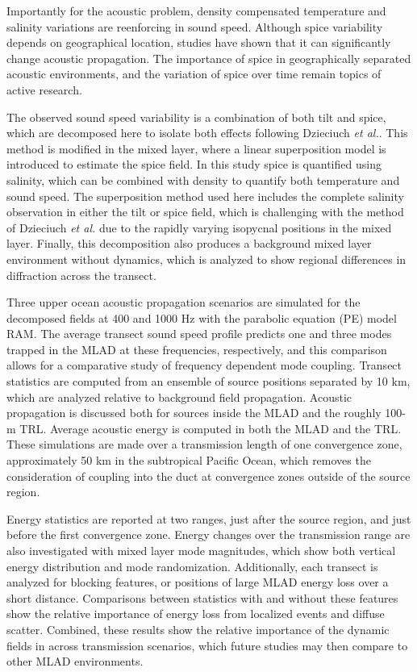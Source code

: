 \documentclass[preprint,NumberedRefs]{JASA}
\begin{document}
Importantly for the acoustic problem, density compensated temperature and salinity variations are reenforcing in sound speed. Although spice variability depends on geographical location, studies have shown that it can significantly change acoustic propagation\citep{colosi12,colosi13,murat2021}. The importance of spice in geographically separated acoustic environments, and the variation of spice over time remain topics of active research.

The observed sound speed variability is a combination of both tilt and spice, which are decomposed here to isolate both effects following Dzieciuch \emph{et al.}\citep{dzieciuch2004}. This method is modified in the mixed layer, where a linear superposition model is introduced to estimate the spice field. In this study spice is quantified using salinity, which can be combined with density to quantify both temperature and sound speed. The superposition method used here includes the complete salinity observation in either the tilt or spice field, which is challenging with the method of Dzieciuch \emph{et al.}\cite{dzieciuch2004} due to the rapidly varying isopycnal positions in the mixed layer. Finally, this decomposition also produces a background mixed layer environment without dynamics, which is analyzed to show regional differences in diffraction across the transect.

Three upper ocean acoustic propagation scenarios are simulated for the decomposed fields at 400 and 1000 Hz with the parabolic equation (PE) model RAM\cite{collins93}. The average transect sound speed profile predicts one and three modes trapped in the MLAD at these frequencies, respectively, and this comparison allows for a comparative study of frequency dependent mode coupling. Transect statistics are computed from an ensemble of source positions separated by 10 km, which are analyzed relative to background field propagation. Acoustic propagation is discussed both for sources inside the MLAD and the roughly 100-m TRL. Average acoustic energy is computed in both the MLAD and the TRL. These simulations are made over a transmission length of one convergence zone\citep{jensen2011computational}, approximately 50 km in the subtropical Pacific Ocean, which removes the consideration of coupling into the duct at convergence zones outside of the source region\citep{colosi2020observations}.

Energy statistics are reported at two ranges, just after the source region, and just before the first convergence zone. Energy changes over the transmission range are also investigated with mixed layer mode magnitudes, which show both vertical energy distribution and mode randomization. Additionally, each transect is analyzed for blocking features\citep{colosi2020observations}, or positions of large MLAD energy loss over a short distance. Comparisons between statistics with and without these features show the relative importance of energy loss from localized events and diffuse scatter. Combined, these results show the relative importance of the dynamic fields in across transmission scenarios, which future studies may then compare to other MLAD environments.
\end{document}
